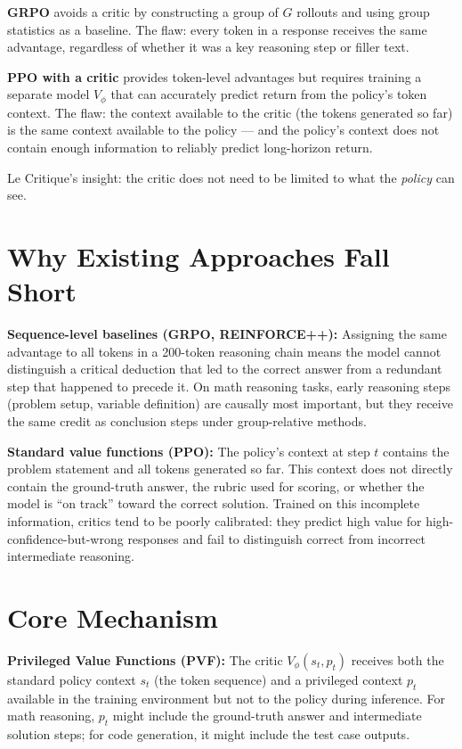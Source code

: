 \documentclass[10pt,twocolumn]{article}
\begin{document}
\textbf{GRPO} avoids a critic by constructing a group of $G$ rollouts
and using group statistics as a baseline. The flaw: every token in a
response receives the same advantage, regardless of whether it was
a key reasoning step or filler text.

\textbf{PPO with a critic} provides token-level advantages but requires
training a separate model $V_\phi$ that can accurately predict return
from the policy's token context. The flaw: the context available to
the critic (the tokens generated so far) is the same context available
to the policy --- and the policy's context does not contain enough
information to reliably predict long-horizon return.

Le Critique's insight: the critic does not need to be limited to what
the \emph{policy} can see.

\section{Why Existing Approaches Fall Short}

\textbf{Sequence-level baselines (GRPO, REINFORCE++):} Assigning
the same advantage to all tokens in a 200-token reasoning chain means
the model cannot distinguish a critical deduction that led to the
correct answer from a redundant step that happened to precede it.
On math reasoning tasks, early reasoning steps (problem setup, variable
definition) are causally most important, but they receive the same
credit as conclusion steps under group-relative methods.

\textbf{Standard value functions (PPO):} The policy's context at step
$t$ contains the problem statement and all tokens generated so far.
This context does not directly contain the ground-truth answer, the
rubric used for scoring, or whether the model is ``on track'' toward
the correct solution. Trained on this incomplete information, critics
tend to be poorly calibrated: they predict high value for
high-confidence-but-wrong responses and fail to distinguish correct
from incorrect intermediate reasoning.

\section{Core Mechanism}

\textbf{Privileged Value Functions (PVF):} The critic $V_\phi(s_t, p_t)$
receives both the standard policy context $s_t$ (the token sequence)
and a privileged context $p_t$ available in the training environment
but not to the policy during inference. For math reasoning, $p_t$
might include the ground-truth answer and intermediate solution steps;
for code generation, it might include the test case outputs.
\end{document}
